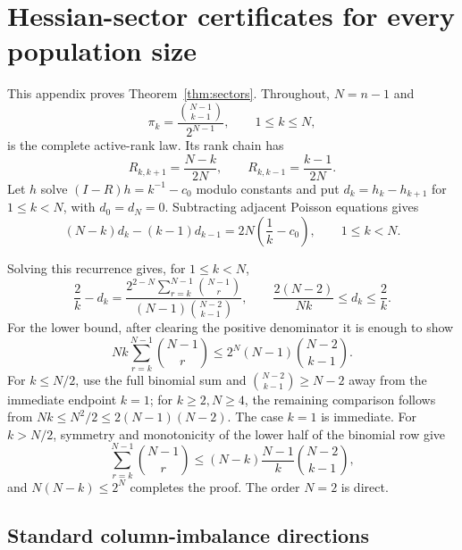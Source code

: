 \section{Hessian-sector certificates for every population size}\label{app:sectors}

This appendix proves Theorem~\ref{thm:sectors}.  Throughout, $N=n-1$ and
\[
 \pi_k=\frac{\binom{N-1}{k-1}}{2^{N-1}},\qquad 1\le k\le N, \tag{A.1}\label{A.1}
\]
is the complete active-rank law.  Its rank chain has
\[
 R_{k,k+1}=\frac{N-k}{2N},\qquad
 R_{k,k-1}=\frac{k-1}{2N}.                                  \tag{A.2}\label{A.2}
\]
Let $h$ solve $(I-R)h=k^{-1}-c_0$ modulo constants and put
$d_k=h_k-h_{k+1}$ for $1\le k<N$, with $d_0=d_N=0$.
Subtracting adjacent Poisson equations
gives
\[
 (N-k)d_k-(k-1)d_{k-1}
 =2N\left(\frac1k-c_0\right),\qquad 1\le k<N.              \tag{A.3}\label{A.3}
\]

Solving this recurrence gives, for $1\le k<N$,
\[
 \frac{2}{k}-d_k=
 \frac{2^{2-N}\sum_{r=k}^{N-1}\binom{N-1}{r}}
  {(N-1)\binom{N-2}{k-1}},
 \qquad
 \frac{2(N-2)}{Nk}\le d_k\le \frac{2}{k}.                \tag{A.3a}\label{A.3a}
\]
For the lower bound, after clearing the positive denominator it is enough to
show
\[
 Nk\sum_{r=k}^{N-1}\binom{N-1}{r}
 \le2^N(N-1)\binom{N-2}{k-1}.                              \tag{A.3b}\label{A.3b}
\]
For $k\le N/2$, use the full binomial sum and
$\binom{N-2}{k-1}\ge N-2$ away from the immediate endpoint $k=1$; for
$k\ge2,N\ge4$, the remaining comparison follows from
$Nk\le N^2/2\le2(N-1)(N-2)$.  The case $k=1$ is immediate.
For $k>N/2$, symmetry and monotonicity of the lower half of the binomial
row give
\[
 \sum_{r=k}^{N-1}\binom{N-1}{r}
 \le (N-k)\frac{N-1}{k}\binom{N-2}{k-1},
\]
and $N(N-k)\le2^N$ completes the proof.  The order $N=2$ is direct.

\subsection{Standard column-imbalance directions}


